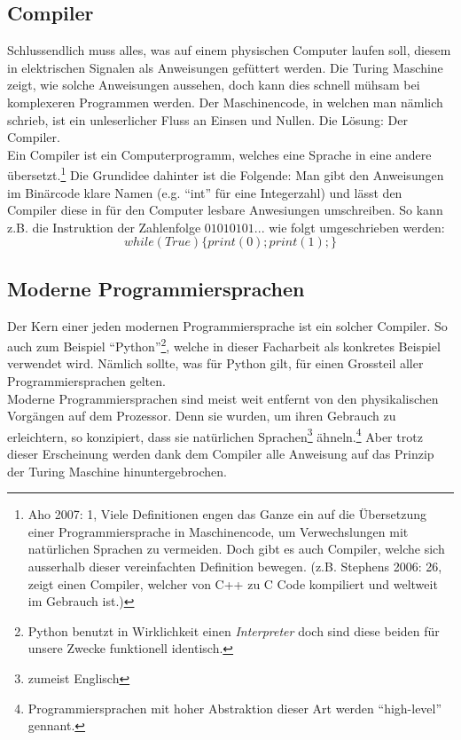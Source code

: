 \documentclass[10pt,a4paper]{article}
\begin{document}
\subsection{Compiler}
Schlussendlich muss alles, was auf einem physischen Computer laufen soll, diesem in elektrischen Signalen als Anweisungen gefüttert werden. Die Turing Maschine zeigt, wie solche Anweisungen aussehen, doch kann dies schnell mühsam bei komplexeren Programmen werden. Der Maschinencode, in welchen man nämlich schrieb, ist ein unleserlicher Fluss an Einsen und Nullen. Die Lösung: Der Compiler. \\
Ein Compiler ist ein Computerprogramm, welches eine Sprache in eine andere übersetzt.\footnote{Aho 2007: 1, Viele Definitionen engen das Ganze ein auf die Übersetzung einer Programmiersprache in Maschinencode, um Verwechslungen mit natürlichen Sprachen zu vermeiden. Doch gibt es auch Compiler, welche sich ausserhalb dieser vereinfachten Definition bewegen. (z.B. Stephens 2006: 26, zeigt einen Compiler, welcher von C++ zu C Code kompiliert und weltweit im Gebrauch ist.)} Die Grundidee dahinter ist die Folgende: Man gibt den Anweisungen im Binärcode klare Namen (e.g. \enquote{int} für eine Integerzahl) und lässt den Compiler diese in für den Computer lesbare Anwesiungen umschreiben. So kann z.B. die Instruktion der Zahlenfolge $01010101...$ wie folgt umgeschrieben werden: 
$$ while (True) \{ print(0); print(1);\} $$

\subsection{Moderne Programmiersprachen}
Der Kern einer jeden modernen Programmiersprache ist ein solcher Compiler. So auch zum Beispiel \enquote{Python}\footnote{Python benutzt in Wirklichkeit einen \textit{Interpreter} doch sind diese beiden für unsere Zwecke funktionell identisch.}, welche in dieser Facharbeit als konkretes Beispiel verwendet wird. Nämlich sollte, was für Python gilt, für einen Grossteil aller Programmiersprachen gelten.\\
Moderne Programmiersprachen sind meist weit entfernt von den physikalischen Vorgängen auf dem Prozessor. Denn sie wurden, um ihren Gebrauch zu erleichtern, so konzipiert, dass sie natürlichen Sprachen\footnote{zumeist Englisch} ähneln.\footnote{Programmiersprachen mit hoher Abstraktion dieser Art werden \enquote{high-level} gennant.} Aber trotz dieser Erscheinung werden dank dem Compiler alle Anweisung auf das Prinzip der Turing Maschine hinuntergebrochen.
\end{document}
